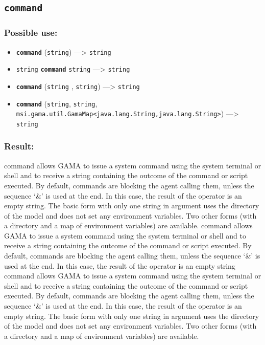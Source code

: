 \documentclass[]{book}
\providecommand{\tightlist}{%
  \setlength{\itemsep}{0pt}\setlength{\parskip}{0pt}}
\theoremstyle{definition}
\theoremstyle{definition}
\theoremstyle{definition}
\theoremstyle{remark}
\begin{document}
\subsection{\texorpdfstring{\texttt{command}}{command}}\label{command}

\subsubsection{Possible use:}\label{possible-use-93}

\begin{itemize}
\tightlist
\item
  \textbf{\texttt{command}} (\texttt{string}) ---\textgreater{}
  \texttt{string}
\item
  \texttt{string} \textbf{\texttt{command}} \texttt{string}
  ---\textgreater{} \texttt{string}
\item
  \textbf{\texttt{command}} (\texttt{string} , \texttt{string})
  ---\textgreater{} \texttt{string}
\item
  \textbf{\texttt{command}} (\texttt{string}, \texttt{string},
  \texttt{msi.gama.util.GamaMap\textless{}java.lang.String,java.lang.String\textgreater{}})
  ---\textgreater{} \texttt{string}
\end{itemize}

\subsubsection{Result:}\label{result-91}

command allows GAMA to issue a system command using the system terminal
or shell and to receive a string containing the outcome of the command
or script executed. By default, commands are blocking the agent calling
them, unless the sequence `\&' is used at the end. In this case, the
result of the operator is an empty string. The basic form with only one
string in argument uses the directory of the model and does not set any
environment variables. Two other forms (with a directory and a map of
environment variables) are available. command allows GAMA to issue a
system command using the system terminal or shell and to receive a
string containing the outcome of the command or script executed. By
default, commands are blocking the agent calling them, unless the
sequence `\&' is used at the end. In this case, the result of the
operator is an empty string command allows GAMA to issue a system
command using the system terminal or shell and to receive a string
containing the outcome of the command or script executed. By default,
commands are blocking the agent calling them, unless the sequence `\&'
is used at the end. In this case, the result of the operator is an empty
string. The basic form with only one string in argument uses the
directory of the model and does not set any environment variables. Two
other forms (with a directory and a map of environment variables) are
available.
\end{document}
